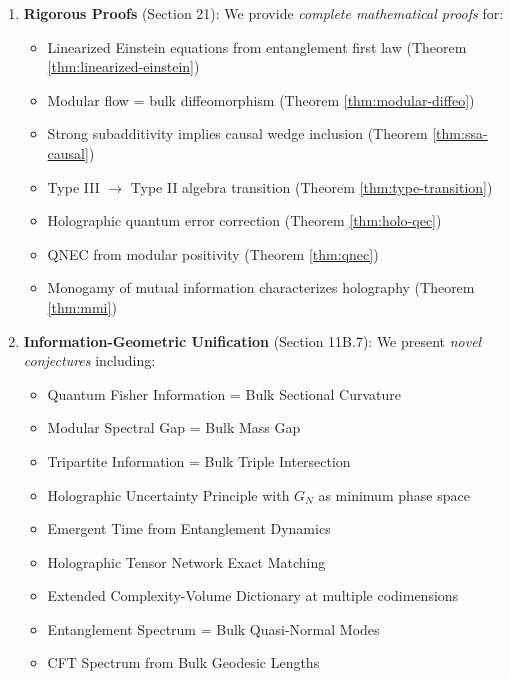 \documentclass[12pt,a4paper]{article}
\begin{document}
\begin{enumerate}
    \item \textbf{Rigorous Proofs} (Section 21): We provide \textit{complete mathematical proofs} for:
    \begin{itemize}
        \item Linearized Einstein equations from entanglement first law (Theorem \ref{thm:linearized-einstein})
        \item Modular flow = bulk diffeomorphism (Theorem \ref{thm:modular-diffeo})
        \item Strong subadditivity implies causal wedge inclusion (Theorem \ref{thm:ssa-causal})
        \item Type III $\to$ Type II algebra transition (Theorem \ref{thm:type-transition})
        \item Holographic quantum error correction (Theorem \ref{thm:holo-qec})
        \item QNEC from modular positivity (Theorem \ref{thm:qnec})
        \item Monogamy of mutual information characterizes holography (Theorem \ref{thm:mmi})
    \end{itemize}
    
    \item \textbf{Information-Geometric Unification} (Section 11B.7): We present \textit{novel conjectures} including:
    \begin{itemize}
        \item Quantum Fisher Information = Bulk Sectional Curvature
        \item Modular Spectral Gap = Bulk Mass Gap
        \item Tripartite Information = Bulk Triple Intersection
        \item Holographic Uncertainty Principle with $G_N$ as minimum phase space
        \item Emergent Time from Entanglement Dynamics
        \item Holographic Tensor Network Exact Matching
        \item Extended Complexity-Volume Dictionary at multiple codimensions
        \item Entanglement Spectrum = Bulk Quasi-Normal Modes
        \item CFT Spectrum from Bulk Geodesic Lengths
    \end{itemize}
    

\end{enumerate}
\end{document}
